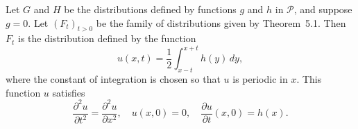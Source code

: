 \begin{corollary}
Let $G$ and $H$ be the distributions defined by functions $g$ and $h$ in $\mathcal{P}$, and suppose $g = 0$. Let $(F_t)_{t>0}$ be the family of distributions given by Theorem~5.1. Then $F_t$ is the distribution defined by the function
$$
u(x, t) = \frac{1}{2} \int_{x-t}^{x+t} h(y) \, dy,
$$
where the constant of integration is chosen so that $u$ is periodic in $x$. This function $u$ satisfies
$$
\frac{\partial^2 u}{\partial t^2} = \frac{\partial^2 u}{\partial x^2}, \quad
u(x, 0) = 0, \quad
\frac{\partial u}{\partial t}(x, 0) = h(x).
$$
\end{corollary}
